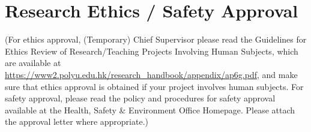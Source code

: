 \documentclass[
  11pt,
  a4paper,
  oneside
]{article}
\begin{document}
\section{Research Ethics / Safety Approval}

\vspace{-0.15in}

(For ethics approval, (Temporary) Chief Supervisor please read the Guidelines for Ethics Review of Research/Teaching Projects Involving Human Subjects, which are available at \url{https://www2.polyu.edu.hk/research_handbook/appendix/ap6g.pdf}, and make sure that ethics approval is obtained if your project involves human subjects.  For safety approval, please read the policy and procedures for safety approval available at the Health, Safety \& Environment Office Homepage.   Please attach the approval letter where appropriate.)\\
\end{document}
